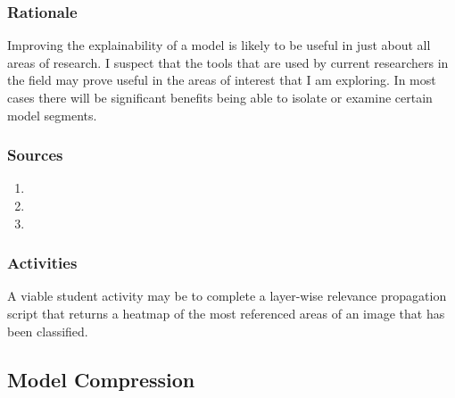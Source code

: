 \documentclass[12pt]{amsart}
\begin{document}
\subsubsection{Rationale}
Improving the explainability of a model is likely to be useful in just about all areas of research.
I suspect that the tools that are used by current researchers in the field may prove useful
in the areas of interest that I am exploring. In most cases there will be significant benefits 
being able to isolate or examine certain model segments.

\subsubsection{Sources}
\begin{enumerate}
	\item 
	\item 
	\item 
\end{enumerate}

\subsubsection{Activities}
A viable student activity may be to complete a layer-wise relevance propagation script that returns a heatmap
of the most referenced areas of an image that has been classified.


\subsection{Model Compression}
\end{document}
